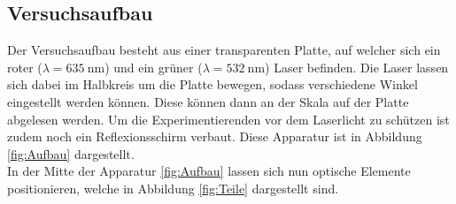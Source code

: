 \subsection{Versuchsaufbau}
\label{sec:aufbau}
Der Versuchsaufbau besteht aus einer transparenten Platte, auf welcher sich ein roter
($\lambda=\SI{635}{\nano\metre}$) und ein grüner ($\lambda=\SI{532}{\nano\metre}$) Laser
befinden. Die Laser lassen sich dabei im Halbkreis um die Platte bewegen, sodass verschiedene
Winkel eingestellt werden können. Diese können dann an der Skala auf der Platte abgelesen werden.
Um die Experimentierenden vor dem Laserlicht zu schützen ist zudem noch ein Reflexionsschirm
verbaut. Diese Apparatur ist in Abbildung \ref{fig:Aufbau} dargestellt.
\\\noindent
In der Mitte der Apparatur \ref{fig:Aufbau} lassen sich nun optische Elemente positionieren, welche
in Abbildung \ref{fig:Teile} dargestellt sind.
%
%
